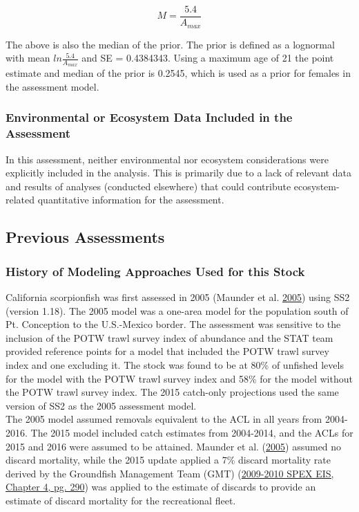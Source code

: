\documentclass[12pt,]{article}
\begin{document}
\begin{equation}
M = \frac{5.4}{A_{max}}
\end{equation}

The above is also the median of the prior. The prior is defined as a
lognormal with mean \(ln\frac{5.4}{A_{max}}\) and SE = 0.4384343. Using
a maximum age of 21 the point estimate and median of the prior is
0.2545, which is used as a prior for females in the assessment model.

\vspace{.5cm}

\subsubsection{Environmental or Ecosystem Data Included in the
Assessment}\label{environmental-or-ecosystem-data-included-in-the-assessment}

In this assessment, neither environmental nor ecosystem considerations
were explicitly included in the analysis. This is primarily due to a
lack of relevant data and results of analyses (conducted elsewhere) that
could contribute ecosystem-related quantitative information for the
assessment.

\subsection{Previous Assessments}\label{previous-assessments}

\subsubsection{History of Modeling Approaches Used for this
Stock}\label{history-of-modeling-approaches-used-for-this-stock}

California scorpionfish was first assessed in 2005 (Maunder et al.
\protect\hyperlink{ref-Maunder2005}{2005}) using SS2 (version 1.18). The
2005 model was a one-area model for the population south of Pt.
Conception to the U.S.-Mexico border. The assessment was sensitive to
the inclusion of the POTW trawl survey index of abundance and the STAT
team provided reference points for a model that included the POTW trawl
survey index and one excluding it. The stock was found to be at 80\% of
unfished levels for the model with the POTW trawl survey index and 58\%
for the model without the POTW trawl survey index. The 2015 catch-only
projections used the same version of SS2 as the 2005 assessment model.\\
The 2005 model assumed removals equivalent to the ACL in all years from
2004-2016. The 2015 model included catch estimates from 2004-2014, and
the ACLs for 2015 and 2016 were assumed to be attained. Maunder et al.
(\protect\hyperlink{ref-Maunder2005}{2005}) assumed no discard
mortality, while the 2015 update applied a 7\% discard mortality rate
derived by the Groundfish Management Team (GMT)
(\href{http://www.pcouncil.org/wp-content/uploads/chp4_0910.pdf}{2009-2010
SPEX EIS, Chapter 4, pg. 290}) was applied to the estimate of discards
to provide an estimate of discard mortality for the recreational fleet.
\end{document}

